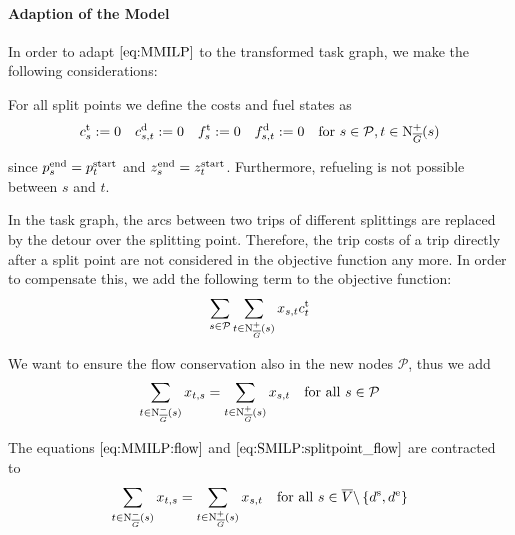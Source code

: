 \paragraph{Adaption of the Model} \parfill

In order to adapt $\eqref{eq:MMILP}$ to the transformed task graph, we make the following considerations:

For all split points we define the costs and fuel states as
\begin{align*}
	c^{\operatorname{t}}_s := 0 && c^{\operatorname{d}}_{s,t} := 0 && f^{\operatorname{t}}_s := 0 && f^{\operatorname{d}}_{s,t} := 0 && \text{for } s\in \mathcal{P},t\in\operatorname{N}_{\overline{G}}^+(s)
\end{align*}

since $p^{\operatorname{end}}_s = p^{\operatorname{start}}_t$ and $z^{\operatorname{end}}_s = z^{\operatorname{start}}_t$. Furthermore, refueling is not possible between $s$ and $t$.

In the task graph, the arcs between two trips of different splittings are replaced by the detour over the splitting point. Therefore, the trip costs of a trip directly after a split point are not considered in the objective function any more. In order to compensate this, we add the following term to the objective function:
\begin{align*}
	\sum_{s\in \mathcal{P}}\sum_{t\in\operatorname{N}_{\overline{G}}^+(s)}x_{s,t}c^{\operatorname{t}}_t
\end{align*}

We want to ensure the flow conservation also in the new nodes $\mathcal{P}$, thus we add
\begin{align}
	\sum_{t\in\operatorname{N}_{\overline{G}}^-(s)} x_{t,s} = \sum_{t\in\operatorname{N}_{\overline{G}}^+(s)} x_{s,t} & & \text{for all } s\in\mathcal{P} \label{eq:SMILP:splitpoint_flow}
\end{align}

The equations $\eqref{eq:MMILP:flow}$ and $\eqref{eq:SMILP:splitpoint_flow}$ are contracted to
\begin{align}
	\sum_{t\in\operatorname{N}_{\overline{G}}^-(s)} x_{t,s} = \sum_{t\in\operatorname{N}_{\overline{G}}^+(s)} x_{s,t} & & \text{for all } s\in \overline{V}\backslash\left\{d^{\operatorname{s}},d^{\operatorname{e}}\right\} \label{eq:SMILP:flow}
\end{align}

\newpage

